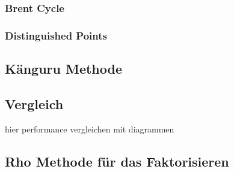 \documentclass{scrartcl}
\begin{document}

\subsubsection{Brent Cycle}
\label{sec:brent_cycle}

\cite{Brent1980}

\subsubsection{Distinguished Points}
\label{sec:distinguished_points}


\cite{VanOorschot1999}

\subsection{Känguru Methode}
\label{sec:kaenguru}

\subsection{Vergleich}

hier performance vergleichen mit diagrammen

\subsection{Rho Methode für das Faktorisieren}
\label{sec:rho_faktorisieren}


\cite{Pollard1975}

\newpage
\printbibliography[heading=bibintoc]
\end{document}
